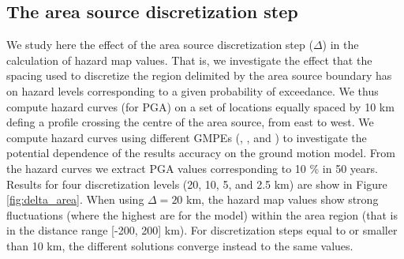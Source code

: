 \subsection{The area source discretization step}
We study here the effect of the area source discretization step ($\Delta$) in the calculation of hazard map values. That is, we investigate the effect that the spacing used to discretize the region delimited by the area
source boundary has on hazard levels corresponding to a given probability of exceedance. We thus compute
hazard curves (for PGA) on a set of locations equally spaced by 10 km defing a profile crossing the centre of the area source, from east to west.
We compute hazard curves using different GMPEs (\cite{boore2008}, \cite{chiou2008}, \cite{campbell2008} and \cite{abrahamson2008}) to investigate the potential dependence of the results accuracy on the ground motion model. From the hazard curves we extract PGA values corresponding to 10 \% in 50 years. Results for four discretization levels (20, 10, 5, and 2.5 km) are show in
Figure \ref{fig:delta_area}. When using $\Delta=20$ km, the hazard map values show strong fluctuations
 (where the highest are for the \cite{boore2008} model) within the area region (that is in the distance
range [-200, 200] km). For discretization steps equal to or smaller than 10 km, the different solutions converge instead to the same values.
